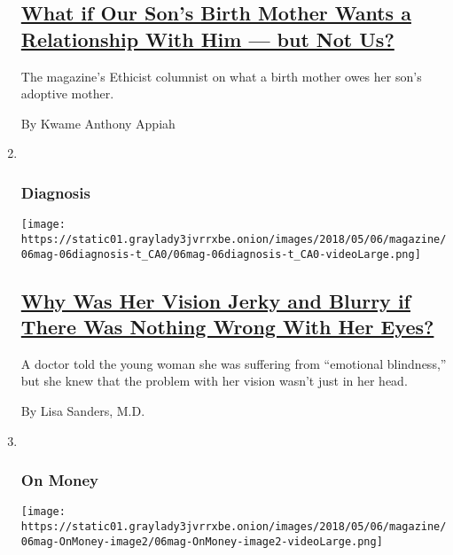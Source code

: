 \begin{enumerate}
  \hypertarget{what-if-our-sons-birth-mother-wants-a-relationship-with-him--but-not-us}{%
  \subsection{\texorpdfstring{\href{/2018/05/02/magazine/what-if-our-sons-birth-mother-wants-a-relationship-with-him-but-not-us.html}{What
  if Our Son's Birth Mother Wants a Relationship With Him --- but Not
  Us?}}{What if Our Son's Birth Mother Wants a Relationship With Him --- but Not Us?}}\label{what-if-our-sons-birth-mother-wants-a-relationship-with-him--but-not-us}}

  The magazine's Ethicist columnist on what a birth mother owes her
  son's adoptive mother.

  By Kwame Anthony Appiah
\item ~
  \hypertarget{diagnosis}{%
  \subsubsection{Diagnosis}\label{diagnosis}}

  \texttt{[image: https://static01.graylady3jvrrxbe.onion/images/2018/05/06/magazine/06mag-06diagnosis-t\_CA0/06mag-06diagnosis-t\_CA0-videoLarge.png]}

  \hypertarget{why-was-her-vision-jerky-and-blurry-if-there-was-nothing-wrong-with-her-eyes}{%
  \subsection{\texorpdfstring{\href{/2018/05/01/magazine/why-was-her-vision-jerky-and-blurry-if-there-was-nothing-wrong-with-her-eyes.html}{Why
  Was Her Vision Jerky and Blurry if There Was Nothing Wrong With Her
  Eyes?}}{Why Was Her Vision Jerky and Blurry if There Was Nothing Wrong With Her Eyes?}}\label{why-was-her-vision-jerky-and-blurry-if-there-was-nothing-wrong-with-her-eyes}}

  A doctor told the young woman she was suffering from ``emotional
  blindness,'' but she knew that the problem with her vision wasn't just
  in her head.

  By Lisa Sanders, M.D.
\item ~
  \hypertarget{on-money}{%
  \subsubsection{On Money}\label{on-money}}

  \texttt{[image: https://static01.graylady3jvrrxbe.onion/images/2018/05/06/magazine/06mag-OnMoney-image2/06mag-OnMoney-image2-videoLarge.png]}


\end{enumerate}
